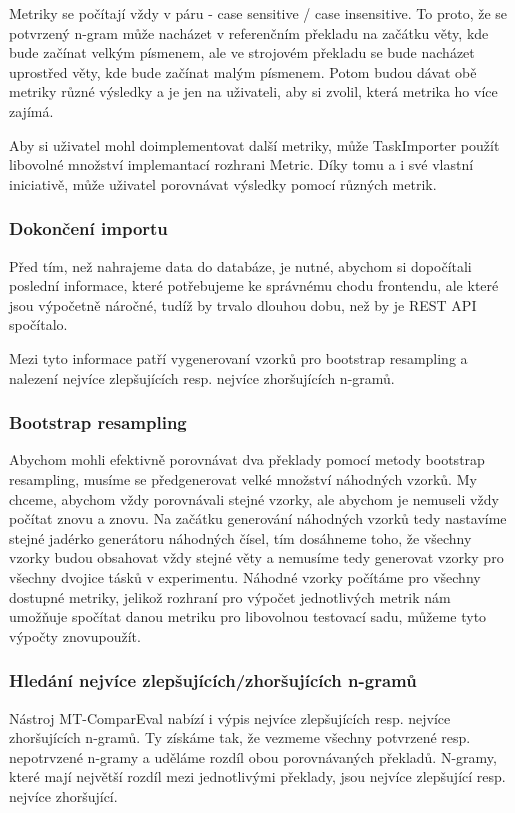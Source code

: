 Metriky se počítají vždy v páru - case sensitive / case insensitive.
To proto, že se potvrzený n-gram může nacházet v referenčním překladu na začátku věty,
  kde bude začínat velkým písmenem,
  ale ve strojovém překladu se bude nacházet uprostřed věty,
  kde bude začínat malým písmenem.
Potom budou dávat obě metriky různé výsledky 
  a je jen na uživateli,
  aby si zvolil, která metrika ho více zajímá.

Aby si uživatel mohl doimplementovat další metriky,
  může TaskImporter použít libovolné množství implemantací rozhrani Metric.
Díky tomu a i své vlastní iniciativě,
  může uživatel porovnávat výsledky pomocí různých metrik.

\subsubsection{Dokončení importu}
Před tím, než nahrajeme data do databáze, je nutné,
  abychom si dopočítali poslední informace,
  které potřebujeme ke správnému chodu frontendu,
  ale které jsou výpočetně náročné,
  tudíž by trvalo dlouhou dobu,
  než by je REST API spočítalo.

Mezi tyto informace patří vygenerovaní vzorků pro bootstrap resampling a
  nalezení nejvíce zlepšujících resp. nejvíce zhoršujících n-gramů.

\subsubsection{Bootstrap resampling}
Abychom mohli efektivně porovnávat dva překlady pomocí metody bootstrap resampling,
  musíme se předgenerovat velké množství náhodných vzorků.
My chceme,
  abychom vždy porovnávali stejné vzorky,
  ale abychom je nemuseli vždy počítat znovu a znovu.
Na začátku generování náhodných vzorků tedy nastavíme stejné jadérko generátoru náhodných čísel,
  tím dosáhneme toho,
  že všechny vzorky budou obsahovat vždy stejné věty
  a nemusíme tedy generovat vzorky pro všechny dvojice tásků v experimentu.
Náhodné vzorky počítáme pro všechny dostupné metriky,
  jelikož rozhraní pro výpočet jednotlivých metrik nám umožňuje spočítat danou metriku pro libovolnou testovací sadu,
  můžeme tyto výpočty znovupoužít.


\subsubsection{Hledání nejvíce zlepšujících/zhoršujících n-gramů}
Nástroj MT-ComparEval nabízí i výpis nejvíce zlepšujících resp. nejvíce zhoršujících n-gramů.
Ty získáme tak, že vezmeme všechny potvrzené resp. nepotrvzené n-gramy
  a uděláme rozdíl obou porovnávaných překladů.
N-gramy,
  které mají největší rozdíl mezi jednotlivými překlady,
  jsou nejvíce zlepšující resp. nejvíce zhoršující.

